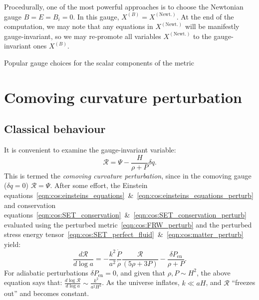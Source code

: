 Procedurally, one of  the most powerful approaches is to choose the Newtonian gauge ${B=E=B_i=0}$. In this gauge, $X^{(B)}=X^{(\text{Newt.})}$. At the end of the computation, we may note that any equations in $X^{(\text{Newt.})}$ will be manifestly gauge-invariant, so we may re-promote all variables $X^{(\text{Newt.})}$ to the gauge-invariant ones $X^{(B)}$.


\begin{table}[tp]
  \centering
  
\caption{Popular gauge choices for the scalar components of the metric}\label{tab:cos:gauge_choice}
\end{table}

\section{Comoving curvature perturbation}

\subsection{Classical behaviour}
It is convenient to examine the gauge-invariant variable:
\begin{equation}
  \mathcal{R} = \Psi - \frac{H}{\rho+P}\delta q.
  \label{eqn:cos:CCP}
\end{equation}
This is termed the {\em comoving curvature perturbation}, since in the comoving gauge ($\delta q=0$) $\mathcal{R}=\Psi$.
After some effort, the Einstein equations~\eqref{eqn:cos:einsteins_equations}~\&~\eqref{eqn:cos:einsteins_equations_perturb} and conservation equations~\eqref{eqn:cos:SET_conservation}~\&~\eqref{eqn:cos:SET_conservation_perturb} evaluated using the perturbed metric~\eqref{eqn:cos:FRW_perturb} and the perturbed stress energy tensor~\eqref{eqn:cos:SET_perfect_fluid}~\&~\eqref{eqn:cos:matter_perturb} yield:
\begin{equation}
  \frac{d \mathcal{R}}{d \log a} = 
  -\frac{k^2}{a^2}\frac{\dot{P}}{\dot{\rho}}\frac{\mathcal{R}}{(5\rho + 3P)}
  -\frac{\delta P_\mathrm{en}}{\rho+P}.
\end{equation}
For adiabatic perturbations $\delta P_\mathrm{en}=0$, and given that $\rho,P\sim H^2$, the above equation says that: $\frac{d\log \mathcal{R}}{d\log a} \sim \frac{k^2}{a^2H^2}$. As the universe inflates, $k\ll aH$, and $\mathcal{R}$ ``freezes out'' and becomes constant.

